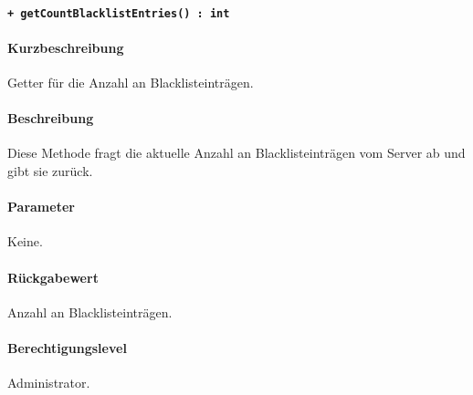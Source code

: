 \paragraph{\texttt{+ getCountBlacklistEntries() : int}}\label{AP_Backend_getCountBlacklistEntries}%
\paragraph*{Kurzbeschreibung}
Getter für die Anzahl an Blacklisteinträgen.
\paragraph*{Beschreibung}
Diese Methode fragt die aktuelle Anzahl an Blacklisteinträgen vom Server ab und gibt sie zurück.
\paragraph*{Parameter}
Keine.
\paragraph*{Rückgabewert}
Anzahl an Blacklisteinträgen.
\paragraph*{Berechtigungslevel}
Administrator.